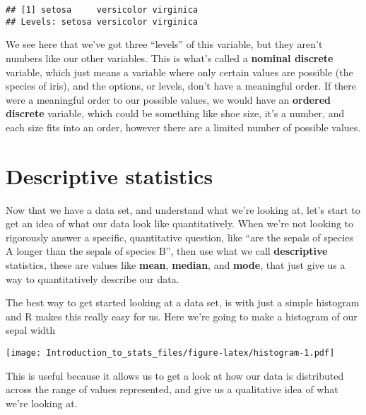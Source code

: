 \documentclass[
]{article}
\newenvironment{Shaded}{\begin{snugshade}}{\end{snugshade}}
\newcommand{\CommentTok}[1]{\textcolor[rgb]{0.56,0.35,0.01}{\textit{#1}}}
\newcommand{\KeywordTok}[1]{\textcolor[rgb]{0.13,0.29,0.53}{\textbf{#1}}}
\newcommand{\NormalTok}[1]{#1}
\newcommand{\OperatorTok}[1]{\textcolor[rgb]{0.81,0.36,0.00}{\textbf{#1}}}
\begin{document}
\begin{verbatim}
## [1] setosa     versicolor virginica 
## Levels: setosa versicolor virginica
\end{verbatim}

We see here that we've got three ``levels'' of this variable, but they
aren't numbers like our other variables. This is what's called a
\textbf{nominal discrete} variable, which just means a variable where
only certain values are possible (the species of iris), and the options,
or levels, don't have a meaningful order. If there were a meaningful
order to our possible values, we would have an \textbf{ordered discrete}
variable, which could be something like shoe size, it's a number, and
each size fits into an order, however there are a limited number of
possible values.

\hypertarget{descriptive-statistics}{%
\section{Descriptive statistics}\label{descriptive-statistics}}

Now that we have a data set, and understand what we're looking at, let's
start to get an idea of what our data look like quantitatively. When
we're not looking to rigorously answer a specific, quantitative
question, like ``are the sepals of species A longer than the sepals of
species B'', then use what we call \textbf{descriptive} statistics,
these are values like \textbf{mean}, \textbf{median}, and \textbf{mode},
that just give us a way to quantitatively describe our data.

The best way to get started looking at a data set, is with just a simple
histogram and R makes this really easy for us. Here we're going to make
a histogram of our sepal width

\begin{Shaded}
\end{Shaded}

\texttt{[image: Introduction\_to\_stats\_files/figure-latex/histogram-1.pdf]}

This is useful because it allows us to get a look at how our data is
distributed across the range of values represented, and give us a
qualitative idea of what we're looking at.
\end{document}
